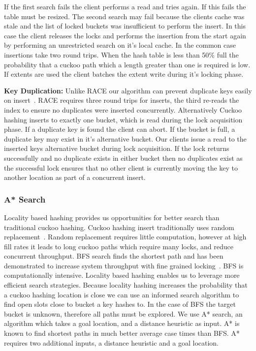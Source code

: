 If the first search fails the client performs a read and
tries again. If this fails the table must be resized. The
second search may fail because the clients cache was stale
and the list of locked buckets was insufficient to perform
the insert. In this case the client releases the locks and
performs the insertion from the start again by performing an
unrestricted search on it's local cache. In the common case
insertions take two round trips. When the hash table is less
than 50\% full the probability that a cuckoo path which a
length greater than one is required is low. If extents are
used the client batches the extent write during it's locking
phase.

\textbf{Key Duplication:} Unlike RACE our algorithm can
prevent duplicate keys easily on insert~\cite{race}. RACE
requires three round trips for inserts, the third re-reads
the index to ensure no duplicates were inserted
concurrently.  Alternatively Cuckoo hashing inserts to
exactly one bucket, which is read during the lock
acquisition phase. If a duplicate key is found the client
can abort. If the bucket is full, a duplicate key may exist
in it's alternative bucket. Our clients issue a read to the
inserted keys alternative bucket during lock acquisition. If
the lock returns successfully and no duplicate exists in
either bucket then no duplicates exist as the successful
lock ensures that no other client is currently moving the
key to another location as part of a concurrent insert.


\subsubsection{A* Search} 

Locality based hashing provides us opportunities for better
search than traditional cuckoo hashing. Cuckoo hashing
insert traditionally uses random replacement~\cite{cuckoo}.
Random replacement requires little computation, however at
high fill rates it leads to long cuckoo paths which require
many locks, and reduce concurrent throughput. BFS search
finds the shortest path and has been demonstrated to
increase system throughput with fine grained
locking~\cite{cuckoo-improvements}.  BFS is
computationally intensive. Locality based hashing enables us
to leverage more efficient search strategies. Because
locality hashing increases the probability that a cuckoo
hashing location is close we can use an informed search
algorithm to find open slots close to bucket a key hashes
to. 
In the case of BFS the target bucket is unknown, therefore
all paths must be explored. We use A* search, an algorithm
which takes a goal location, and a distance heuristic as
input. A* is known to find shortest paths in much better
average case times than BFS. A* requires two additional
inputs, a distance heuristic and a goal location.

